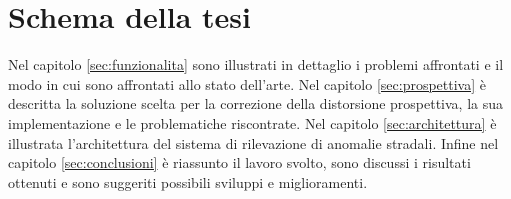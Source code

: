 \section{Schema della tesi}

Nel capitolo \ref{sec:funzionalita} sono illustrati in dettaglio i problemi affrontati e il modo in cui sono affrontati allo stato dell'arte.
Nel capitolo \ref{sec:prospettiva} è descritta la soluzione scelta per la correzione della distorsione prospettiva, la sua implementazione e le problematiche riscontrate.
Nel capitolo \ref{sec:architettura} è illustrata l'architettura del sistema di rilevazione di anomalie stradali.
Infine nel capitolo \ref{sec:conclusioni} è riassunto il lavoro svolto, sono discussi i risultati ottenuti e sono suggeriti possibili sviluppi e miglioramenti.
